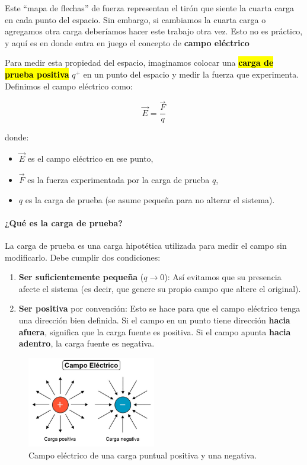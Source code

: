 Este ``mapa de flechas'' de fuerza representan el tirón que siente la cuarta carga en cada punto del espacio. Sin embargo, si cambiamos la cuarta carga o agregamos otra carga deberíamos hacer este trabajo otra vez. Esto no es práctico, y aquí es en donde entra en juego el concepto de \textbf{campo eléctrico}


Para medir esta propiedad del espacio, imaginamos colocar una \hl{\textbf{carga de prueba positiva}} \( q^{+} \) en un punto del espacio y medir la fuerza que experimenta. Definimos el campo eléctrico como:

\begin{equation}
    \vec{E} = \frac{\vec{F}}{q}
    \label{eq:campo_electrico}
\end{equation}

donde:
\begin{itemize}
    \item \( \vec{E} \) es el campo eléctrico en ese punto,
    \item \( \vec{F} \) es la fuerza experimentada por la carga de prueba \( q \),
    \item \( q \) es la carga de prueba (se asume pequeña para no alterar el sistema).
\end{itemize}

\paragraph{¿Qué es la carga de prueba?}

La carga de prueba es una carga hipotética utilizada para medir el campo sin modificarlo. Debe cumplir dos condiciones:
\begin{enumerate}
    \item \textbf{Ser suficientemente pequeña} (\( q \to 0 \)): Así evitamos que su presencia afecte el sistema (es decir, que genere su propio campo que altere el original).
    \item \textbf{Ser positiva} por convención: Esto se hace para que el campo eléctrico tenga una dirección bien definida. Si el campo en un punto tiene dirección \textbf{hacia afuera}, significa que la carga fuente es positiva. Si el campo apunta \textbf{hacia adentro}, la carga fuente es negativa.
\end{enumerate}

\begin{figure}[ht]
    \centering
    \includegraphics[width=0.5\textwidth]{images/electric_field.jpg}
    \caption{Campo eléctrico de una carga puntual positiva y una negativa.}
    \label{fig:campo_electrico}
\end{figure}

